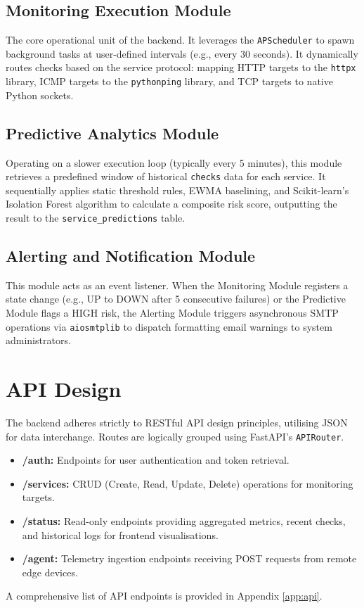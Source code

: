 \documentclass[12pt,a4paper,oneside]{report}
\begin{document}
\subsection{Monitoring Execution Module}
\noindent The core operational unit of the backend. It leverages the \texttt{APScheduler} to spawn background tasks at user-defined intervals (e.g., every 30 seconds). It dynamically routes checks based on the service protocol: mapping HTTP targets to the \texttt{httpx} library, ICMP targets to the \texttt{pythonping} library, and TCP targets to native Python sockets.

\subsection{Predictive Analytics Module}
\noindent Operating on a slower execution loop (typically every 5 minutes), this module retrieves a predefined window of historical \texttt{checks} data for each service. It sequentially applies static threshold rules, EWMA baselining, and Scikit-learn's Isolation Forest algorithm to calculate a composite risk score, outputting the result to the \texttt{service\_predictions} table.

\subsection{Alerting and Notification Module}
\noindent This module acts as an event listener. When the Monitoring Module registers a state change (e.g., UP to DOWN after 5 consecutive failures) or the Predictive Module flags a HIGH risk, the Alerting Module triggers asynchronous SMTP operations via \texttt{aiosmtplib} to dispatch formatting email warnings to system administrators.

\section{API Design}
\noindent The backend adheres strictly to RESTful API design principles, utilising JSON for data interchange. Routes are logically grouped using FastAPI's \texttt{APIRouter}. 
\begin{itemize}[label=\textbullet, leftmargin=*]
    \item \textbf{/auth:} Endpoints for user authentication and token retrieval.
    \item \textbf{/services:} CRUD (Create, Read, Update, Delete) operations for monitoring targets.
    \item \textbf{/status:} Read-only endpoints providing aggregated metrics, recent checks, and historical logs for frontend visualisations.
    \item \textbf{/agent:} Telemetry ingestion endpoints receiving POST requests from remote edge devices.
\end{itemize}
\noindent A comprehensive list of API endpoints is provided in Appendix \ref{app:api}.
\end{document}
